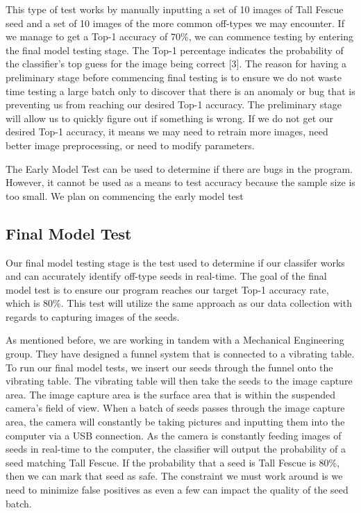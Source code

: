 \documentclass[onecolumn, draftclsnofoot,10pt, compsoc]{IEEEtran}
\begin{document}
This type of test works by manually inputting a set of 10 images of Tall Fescue seed and a set of 10 images of the more common off-types we may encounter. If we manage to get a Top-1 accuracy of 70\%, we can commence testing by entering the final model testing stage. The Top-1 percentage indicates the probability of the classifier’s top guess for the image being correct [3]. The reason for having a preliminary stage before commencing final testing is to ensure we do not waste time testing a large batch only to discover that there is an anomaly or bug that is preventing us from reaching our desired Top-1 accuracy. The preliminary stage will allow us to quickly figure out if something is wrong. If we do not get our desired Top-1 accuracy, it means we may need to retrain more images, need better image preprocessing, or need to modify parameters.  

The Early Model Test can be used to determine if there are bugs in the program. However, it cannot be used as a means to test accuracy because the sample size is too small. We plan on commencing the early model test  

\subsection{Final Model Test}

Our final model testing stage is the test used to determine if our classifer works and can accurately identify off-type seeds in real-time. The goal of the final model test is to ensure our program reaches our target Top-1 accuracy rate, which is 80\%. This test will utilize the same approach as our data collection with regards to capturing images of the seeds.

As mentioned before, we are working in tandem with a Mechanical Engineering group. They have designed a funnel system that is connected to a vibrating table. To run our final model tests, we insert our seeds through the funnel onto the vibrating table. The vibrating table will then take the seeds to the image capture area. The image capture area is the surface area that is within the suspended camera's field of view. When a batch of seeds passes through the image capture area, the camera will constantly be taking pictures and inputting them into the computer via a USB connection. As the camera is constantly feeding images of seeds in real-time to the computer, the classifier will output the probability of a seed matching Tall Fescue. If the probability that a seed is Tall Fescue is 80\%, then we can mark that seed as safe. The constraint we must work around is we need to minimize false positives as even a few can impact the quality of the seed batch. 
\end{document}
